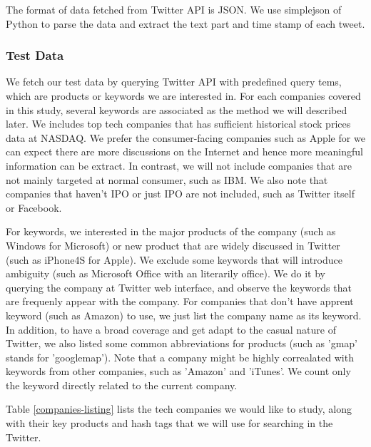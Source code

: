 \documentclass[12pt]{article}
\begin{document}
The format of data fetched from Twitter API is JSON. We use simplejson of Python to parse the data and extract the text part and time stamp of each tweet.

\subsubsection{Test Data}
We fetch our test data by querying Twitter API with predefined query tems, which are products or keywords we are interested in. For each companies covered in this study, several keywords are associated as the method we will described later. We includes top tech companies that has sufficient historical stock prices data at NASDAQ. We prefer the consumer-facing companies such as Apple for we can expect there are more discussions on the Internet and hence more meaningful information can be extract. In contrast, we will not include companies that are not mainly targeted at normal consumer, such as IBM. We also note that companies that haven't IPO or just IPO are not included, such as Twitter itself or Facebook.

For keywords, we interested in the major products of the company (such as Windows for Microsoft) or new product that are widely discussed in Twitter (such as iPhone4S for Apple). We exclude some keywords that will introduce ambiguity (such as Microsoft Office with an literarily office). We do it by querying the company at Twitter web interface, and observe the keywords that are frequenly appear with the company. For companies that don't have apprent keyword (such as Amazon) to use, we just list the company name as its keyword. In addition, to have a broad coverage and get adapt to the casual nature of Twitter, we also listed some common abbreviations for products (such as 'gmap' stands for 'googlemap'). Note that a company might be highly correalated with keywords from other companies, such as 'Amazon' and 'iTunes'. We count only the keyword directly related to the current company.

Table \ref{companies-listing} lists the tech companies we would like to study, along with their key products and hash tags that we will use for searching in the Twitter. 
\end{document}
